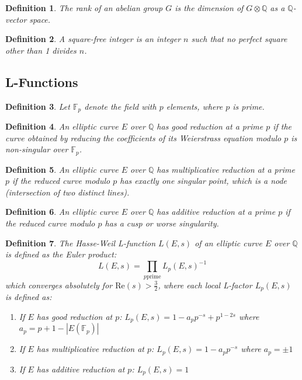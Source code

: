 \documentclass{article}
\newtheorem{definition}{Definition}
\begin{document}
\begin{definition}
  The rank of an abelian group $G$ is the dimension of $G \otimes \mathbb{Q}$
  as a $\mathbb{Q}$-vector space.
\end{definition}

\begin{definition}
  A square-free integer is an integer $n$ such that no perfect square other
  than 1 divides $n$.
\end{definition}

\subsection{L-Functions}

\begin{definition}
  Let $\mathbb{F}_p$ denote the field with $p$ elements, where $p$ is prime.
\end{definition}

\begin{definition}
  An elliptic curve $E$ over $\mathbb{Q}$ has good reduction at a prime $p$ if
  the curve obtained by reducing the coefficients of its Weierstrass equation
  modulo $p$ is non-singular over $\mathbb{F}_p$.
\end{definition}

\begin{definition}
  An elliptic curve $E$ over $\mathbb{Q}$ has multiplicative reduction at a
  prime $p$ if the reduced curve modulo $p$ has exactly one singular point,
  which is a node (intersection of two distinct lines).
\end{definition}

\begin{definition}
  An elliptic curve $E$ over $\mathbb{Q}$ has additive reduction at a prime
  $p$ if the reduced curve modulo $p$ has a cusp or worse singularity.
\end{definition}

\begin{definition}
  The Hasse-Weil L-function $L (E, s)$ of an elliptic curve $E$ over
  $\mathbb{Q}$ is defined as the Euler product:
  \[ L (E, s) = \prod_{p \text{prime}} L_p (E, s)^{- 1} \]
  which converges absolutely for $\mathrm{Re} (s) > \frac{3}{2}$, where each
  local L-factor $L_p (E, s)$ is defined as:
  \begin{enumerate}
    \item If $E$ has good reduction at $p$: $L_p (E, s) = 1 - a_p p^{- s} +
    p^{1 - 2 s}$ where $a_p = p + 1 - |E (\mathbb{F}_p) |$
    
    \item If $E$ has multiplicative reduction at $p$: $L_p (E, s) = 1 - a_p
    p^{- s}$ where $a_p = \pm 1$
    
    \item If $E$ has additive reduction at $p$: $L_p (E, s) = 1$
  \end{enumerate}
\end{definition}
\end{document}
